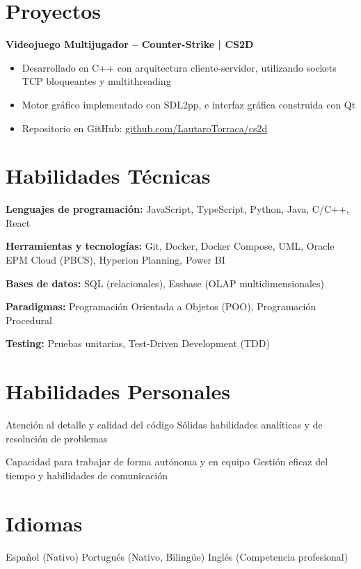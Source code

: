 \documentclass[10pt,a4paper]{article}
\begin{document}
\section*{Proyectos}

\textbf{Videojuego Multijugador -- Counter-Strike | CS2D}
\begin{itemize}[leftmargin=*, noitemsep, topsep=3pt, itemsep=2pt]
  \item Desarrollado en C++ con arquitectura cliente-servidor, utilizando
        sockets TCP bloqueantes y multithreading
  \item Motor gráfico implementado con SDL2pp, e interfaz gráfica construida
        con Qt
  \item Repositorio en GitHub:
        \href{https://github.com/LautaroTorraca/cs2d}{github.com/LautaroTorraca/cs2d}
\end{itemize}

\section*{Habilidades Técnicas}

\textbf{Lenguajes de programación:} JavaScript, TypeScript, Python, Java, C/C++, React

\textbf{Herramientas y tecnologías:} Git, Docker, Docker Compose, UML, Oracle EPM Cloud
(PBCS), Hyperion Planning, Power BI

\textbf{Bases de datos:} SQL (relacionales), Essbase (OLAP multidimensionales)

\textbf{Paradigmas:} Programación Orientada a Objetos (POO), Programación Procedural

\textbf{Testing:} Pruebas unitarias, Test-Driven Development (TDD)

\section*{Habilidades Personales}

Atención al detalle y calidad del código
\quad\textperiodcentered\quad Sólidas habilidades analíticas y de resolución de problemas

Capacidad para trabajar de forma autónoma y en equipo
\quad\textperiodcentered\quad Gestión eficaz del tiempo y habilidades de comunicación

\section*{Idiomas}

Español (Nativo)
\quad\textperiodcentered\quad Portugués (Nativo, Bilingüe)
\quad\textperiodcentered\quad Inglés (Competencia profesional)
\end{document}
